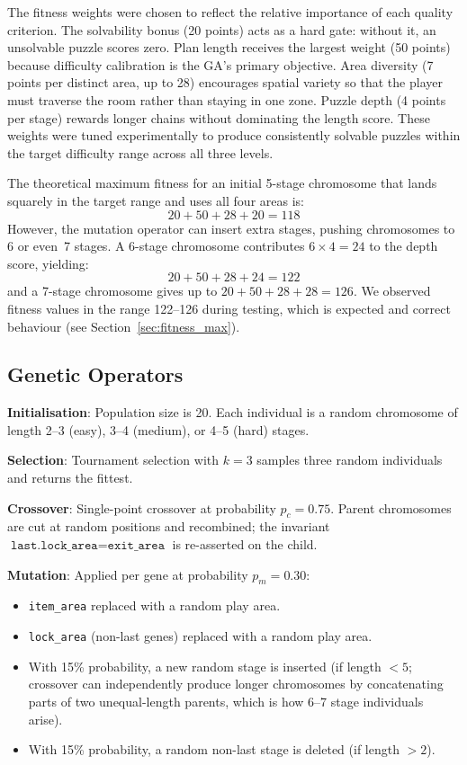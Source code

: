 \documentclass[12pt, a4paper]{report}
\begin{document}
The fitness weights were chosen to reflect the relative importance of each quality criterion.  The solvability bonus (20 points) acts as a hard gate: without it, an unsolvable puzzle scores zero.  Plan length receives the largest weight (50 points) because difficulty calibration is the GA's primary objective.  Area diversity (7 points per distinct area, up to 28) encourages spatial variety so that the player must traverse the room rather than staying in one zone.  Puzzle depth (4 points per stage) rewards longer chains without dominating the length score.  These weights were tuned experimentally to produce consistently solvable puzzles within the target difficulty range across all three levels.

The theoretical maximum fitness for an initial 5-stage chromosome that lands
squarely in the target range and uses all four areas is:
\[
  20 + 50 + 28 + 20 = 118
\]
However, the mutation operator can insert extra stages, pushing chromosomes to
6 or even~7 stages.  A 6-stage chromosome contributes $6 \times 4 = 24$ to the
depth score, yielding:
\[
  20 + 50 + 28 + 24 = 122
\]
and a 7-stage chromosome gives up to $20 + 50 + 28 + 28 = 126$.  We observed
fitness values in the range 122--126 during testing, which is expected and
correct behaviour (see Section~\ref{sec:fitness_max}).

\subsection{Genetic Operators}
\label{sec:gaoperators}

\textbf{Initialisation}: Population size is 20.  Each individual is a random
chromosome of length 2--3 (easy), 3--4 (medium), or 4--5 (hard) stages.

\textbf{Selection}: Tournament selection with $k = 3$ samples three random
individuals and returns the fittest.

\textbf{Crossover}: Single-point crossover at probability $p_c = 0.75$.
Parent chromosomes are cut at random positions and recombined; the invariant
$\texttt{last.lock\_area} = \texttt{exit\_area}$ is re-asserted on the child.

\textbf{Mutation}: Applied per gene at probability $p_m = 0.30$:
\begin{itemize}[leftmargin=1.5em]
  \item \texttt{item\_area} replaced with a random play area.
  \item \texttt{lock\_area} (non-last genes) replaced with a random play area.
  \item With 15\% probability, a new random stage is inserted (if length $< 5$; crossover can independently produce longer chromosomes by concatenating parts of two unequal-length parents, which is how 6--7 stage individuals arise).
  \item With 15\% probability, a random non-last stage is deleted (if
        length $> 2$).
\end{itemize}
\end{document}
